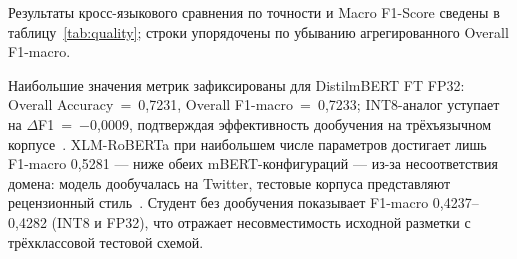 Результаты кросс-языкового сравнения по точности и Macro F1-Score сведены в таблицу~\ref{tab:quality}; строки упорядочены по убыванию агрегированного Overall F1-macro.

\begin{table}[H]
\centering
\caption{Точность и F1 моделей по языкам, бэкенд WASM}
\label{tab:quality}
\end{table}

Наибольшие значения метрик зафиксированы для DistilmBERT FT FP32: Overall Accuracy~=~0{,}7231, Overall F1-macro~=~0{,}7233; INT8-аналог уступает на $\Delta$F1~=~$-$0{,}0009, подтверждая эффективность дообучения на трёхъязычном корпусе~\cite{hasan2024ensemble}. XLM-RoBERTa при наибольшем числе параметров достигает лишь F1-macro 0{,}5281 — ниже обеих mBERT-конфигураций — из-за несоответствия домена: модель дообучалась на Twitter, тестовые корпуса представляют рецензионный стиль~\cite{barbieri2022xlmroberta}. Студент без дообучения показывает F1-macro 0{,}4237–0{,}4282 (INT8 и FP32), что отражает несовместимость исходной разметки с трёхклассовой тестовой схемой.

